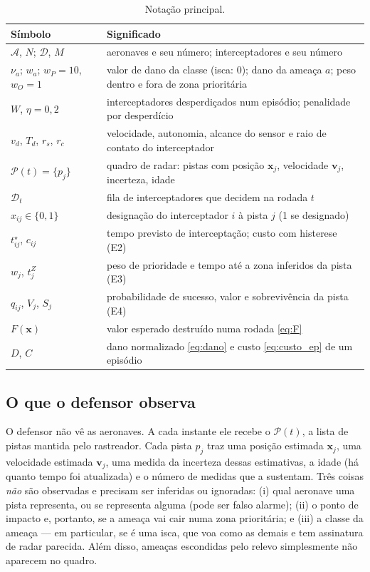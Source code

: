 \begin{table}[t]
\centering
\caption{Notação principal.}
\label{tab:notacao}
\small
\begin{tabularx}{\columnwidth}{@{}lX@{}}
\toprule
Símbolo & Significado \\
\midrule
$\mathcal{A}$, $N$; $\mathcal{D}$, $M$ & aeronaves e seu número; interceptadores e seu número \\
$\nu_a$; $w_a$; $w_P=10$, $w_O=1$ & valor de dano da classe (isca: 0); dano da ameaça $a$; peso dentro e fora de zona prioritária \\
$W$, $\eta=0{,}2$ & interceptadores desperdiçados num episódio; penalidade por desperdício \\
$v_d$, $T_d$, $r_s$, $r_c$ & velocidade, autonomia, alcance do sensor e raio de contato do interceptador \\
$\mathcal{P}(t)=\{p_j\}$ & quadro de radar: pistas com posição $\bm{x}_j$, velocidade $\bm{v}_j$, incerteza, idade \\
$\mathcal{D}_t$ & fila de interceptadores que decidem na rodada $t$ \\
$x_{ij}\in\{0,1\}$ & designação do interceptador $i$ à pista $j$ (1 se designado) \\
$t^\star_{ij}$, $c_{ij}$ & tempo previsto de interceptação; custo com histerese (E2) \\
$w_j$, $t^Z_j$ & peso de prioridade e tempo até a zona inferidos da pista (E3) \\
$q_{ij}$, $V_j$, $S_j$ & probabilidade de sucesso, valor e sobrevivência da pista (E4) \\
$F(\bm{x})$ & valor esperado destruído numa rodada \eqref{eq:F} \\
$D$, $C$ & dano normalizado \eqref{eq:dano} e custo \eqref{eq:custo_ep} de um episódio \\
\bottomrule
\end{tabularx}
\end{table}

\subsection{O que o defensor observa}
O defensor não vê as aeronaves. A cada instante ele recebe o  $\mathcal{P}(t)$, a lista de
pistas mantida pelo rastreador. Cada pista $p_j$ traz uma posição estimada $\bm{x}_j$, uma velocidade estimada $\bm{v}_j$,
uma medida da incerteza dessas estimativas, a idade (há quanto tempo foi atualizada) e o número de medidas que a
sustentam. Três coisas \emph{não} são observadas e precisam ser inferidas ou ignoradas: (i) qual aeronave uma pista
representa, ou se representa alguma (pode ser falso alarme); (ii) o ponto de impacto e, portanto, se a ameaça vai cair
numa zona prioritária; e (iii) a classe da ameaça --- em particular, se é uma isca, que voa como as demais e tem
assinatura de radar parecida. Além disso, ameaças escondidas pelo relevo simplesmente não aparecem no quadro.

